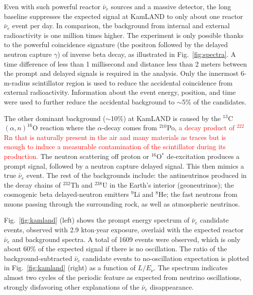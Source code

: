 \documentclass[aps,twocolumn,preprintnumbers,amsmath,superscriptaddress,amssymb,floats,nofootinbib]{revtex4-1}
\begin{document}
Even with such powerful reactor $\bar\nu_e$ sources and a massive detector, the long baseline suppresses the expected signal at KamLAND to only about one reactor $\bar\nu_e$ event per day. 
In comparison, the background from internal and external radioactivity is one million times higher. 
The experiment is only possible thanks to the powerful coincidence signature (the positron followed by the delayed neutron capture $\gamma$) of inverse beta decay, as illustrated in Fig.~\ref{fig:spectra}. 
A time difference of less than 1 millisecond and distance less than 2 meters between the prompt and delayed signals is required in the analysis. 
Only the innermost 6-m-radius scintillator region is used to reduce the accidental coincidence from external radioactivity. 
Information about the event energy, position, and time were used to further reduce the accidental background to $\sim$5\% of the candidates.

The other dominant background ($\sim$10\%) at KamLAND is caused by the $^{13}$C$(\alpha,n)^{16}$O reaction where the $\alpha$-decay comes from $^{210}$Po, \textcolor{red}{a decay product of $^{222}$Rn that is naturally present in the air and many materials as traces but is enough to induce a measurable contamination of the scintillator during its production.}
The neutron scattering off proton or $^{16}$O$^*$ de-excitation produces a prompt signal, followed by a neutron capture delayed signal. This then mimics a true $\bar\nu_e$ event. The rest of the backgrounds include: the antineutrinos produced in the decay chains of $^{232}$Th and $^{238}$U in the Earth's interior (geoneutrinos); the cosmogenic beta delayed-neutron emitters $^{9}$Li and $^{8}$He;  the fast neutrons from muons passing through the surrounding rock, as well as atmospheric neutrinos. 

Fig.~\ref{fig:kamland} (left) shows the prompt energy spectrum of $\bar\nu_e$ candidate
events, observed with 2.9 kton$\cdot$year exposure, overlaid with the expected reactor $\bar\nu_{e}$ and background spectra. A total of 1609 events were observed, which is only about 60\% of the expected signal if there is no oscillation. The ratio of the background-subtracted $\bar\nu_e$ candidate events to no-oscillation expectation is plotted in Fig.~\ref{fig:kamland} (right) as a function of $L/E_{\nu}$. The spectrum indicates almost two cycles of the periodic feature as expected from neutrino oscillations, strongly disfavoring other explanations of the $\bar\nu_e$ disappearance.
\end{document}
